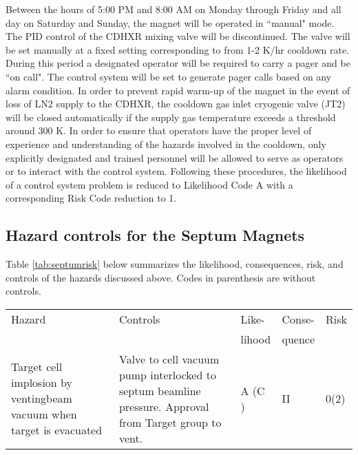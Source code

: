 {\begin{list}{.~}{\setlength{\itemsep}{-0.15cm}}
  \item Between the hours of 5:00 PM and 8:00 AM on Monday through Friday and all day on Saturday and 
    Sunday, the magnet will be operated in ``manual" mode.  The PID control of the CDHXR mixing valve will be 
    discontinued.  The valve will be set manually at a fixed setting corresponding to from 1-2  K/hr cooldown 
    rate.  During this period a designated operator will be required to carry a pager and be ``on call".  The 
    control system will be set to generate pager calls based on any alarm condition.
    In order to prevent rapid warm-up of the magnet in the event of loss of LN2 supply to the CDHXR, the cooldown 
    gas inlet cryogenic valve (JT2) will be closed automatically if the supply gas temperature exceeds a 
    threshold around 300 K.  In order to ensure that operators have the proper level of experience and 
    understanding of the hazards involved in the cooldown, only explicitly designated and trained personnel 
    will be allowed to serve as operators or to interact with the control system.  Following 
    these procedures, the likelihood of a control system problem is reduced to Likelihood Code A with a 
    corresponding Risk Code reduction to 1.
\end{list}

\begin{safetyen}{10}{15}
\subsection {\bf Hazard controls for the Septum Magnets}
\end{safetyen}

Table \ref{tab:septumrisk} below summarizes the likelihood, consequences, risk, and controls of the hazards discussed
above. 
Codes in parenthesis are without controls.

\begin{table}[htp]
\begin{tabular}{|p{120pt}|p{170pt}|l|l|l|}
\hline
Hazard                    & Controls                              & Like-  & Conse- & Risk \\
                          &                                       & lihood & quence &      \\ \hline

Target cell implosion by ventingbeam vacuum when target is evacuated
& Valve to cell vacuum pump interlocked to septum beamline pressure. Approval from Target group to vent.
& A (C ) & II     & 0(2) \\ \hline


\end{tabular}
\end{table}}
